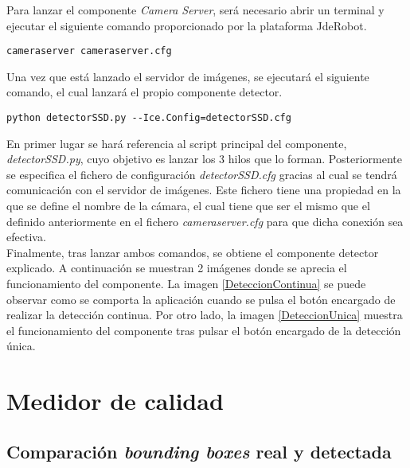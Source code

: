 \documentclass[a4paper, 12pt, oneside]{book}
\begin{document}
Para lanzar el componente \textit{Camera Server}, será necesario abrir un terminal y ejecutar el siguiente comando proporcionado por la plataforma JdeRobot.\\

\begin{lstlisting}[frame=single]
cameraserver cameraserver.cfg
\end{lstlisting}

Una vez que está lanzado el servidor de imágenes, se ejecutará el siguiente comando, el cual lanzará el propio componente detector.\\

\begin{lstlisting}[frame=single]
python detectorSSD.py --Ice.Config=detectorSSD.cfg
\end{lstlisting}

En primer lugar se hará referencia al script principal del componente, \textit{detectorSSD.py}, cuyo objetivo es lanzar los 3 hilos que lo forman. Posteriormente se especifica el fichero de configuración \textit{detectorSSD.cfg} gracias al cual se tendrá comunicación con el servidor de imágenes. Este fichero tiene una propiedad en la que se define el nombre de la cámara, el cual tiene que ser el mismo que el definido anteriormente en el fichero \textit{cameraserver.cfg} para que dicha conexión sea efectiva.\\

Finalmente, tras lanzar ambos comandos, se obtiene el componente detector explicado. A continuación se muestran 2 imágenes donde se aprecia el funcionamiento del componente. La imagen \ref{DeteccionContinua} se puede observar como se comporta la aplicación cuando se pulsa el botón encargado de realizar la detección continua. Por otro lado, la imagen \ref{DeteccionUnica} muestra el funcionamiento del componente tras pulsar el botón encargado de la detección única.

\chapter{Medidor de calidad}

\section{Comparación \textit{bounding boxes} real y detectada}
\end{document}
